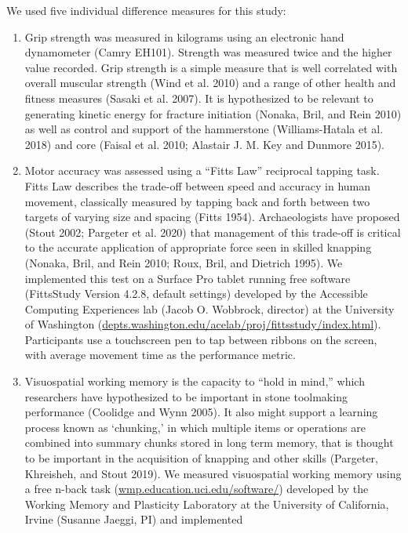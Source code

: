 \documentclass[smallextended]{svjour3}       %
\begin{document}
We used five individual difference measures for this study:

\begin{enumerate}
\def\labelenumi{\arabic{enumi})}
\item
  Grip strength was measured in kilograms using an electronic hand
  dynamometer (Camry EH101). Strength was measured twice and the higher
  value recorded. Grip strength is a simple measure that is well
  correlated with overall muscular strength (Wind et al. 2010) and a
  range of other health and fitness measures (Sasaki et al. 2007). It is
  hypothesized to be relevant to generating kinetic energy for fracture
  initiation (Nonaka, Bril, and Rein 2010) as well as control and
  support of the hammerstone (Williams-Hatala et al. 2018) and core
  (Faisal et al. 2010; Alastair J. M. Key and Dunmore 2015).
\item
  Motor accuracy was assessed using a ``Fitts Law'' reciprocal tapping
  task. Fitts Law describes the trade-off between speed and accuracy in
  human movement, classically measured by tapping back and forth between
  two targets of varying size and spacing (Fitts 1954). Archaeologists
  have proposed (Stout 2002; Pargeter et al. 2020) that management of
  this trade-off is critical to the accurate application of appropriate
  force seen in skilled knapping (Nonaka, Bril, and Rein 2010; Roux,
  Bril, and Dietrich 1995). We implemented this test on a Surface Pro
  tablet running free software (FittsStudy Version 4.2.8, default
  settings) developed by the Accessible Computing Experiences lab (Jacob
  O. Wobbrock, director) at the University of Washington
  (\url{depts.washington.edu/acelab/proj/fittsstudy/index.html}).
  Participants use a touchscreen pen to tap between ribbons on the
  screen, with average movement time as the performance metric.
\item
  Visuospatial working memory is the capacity to ``hold in mind,'' which
  researchers have hypothesized to be important in stone toolmaking
  performance (Coolidge and Wynn 2005). It also might support a learning
  process known as `chunking,' in which multiple items or operations are
  combined into summary chunks stored in long term memory, that is
  thought to be important in the acquisition of knapping and other
  skills (Pargeter, Khreisheh, and Stout 2019). We measured visuospatial
  working memory using a free n-back task
  (\href{https://wmp.education.uci.edu/software/}{wmp.education.uci.edu/software/})
  developed by the Working Memory and Plasticity Laboratory at the
  University of California, Irvine (Susanne Jaeggi, PI) and implemented

\end{enumerate}
\end{document}
